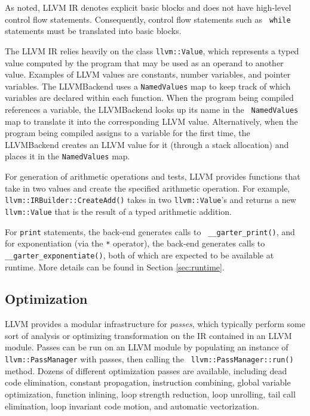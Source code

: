 \documentclass[11pt]{article}
\begin{document}
As noted, LLVM IR denotes explicit basic blocks and does not have high-level
control flow statements.  Consequently, control flow statements such as {\tt
while} statements must be translated into basic blocks.

The LLVM IR relies heavily on the class {\tt llvm::Value}, which represents a
typed value computed by the program that may be used as an operand to another
value.  Examples of LLVM values are constants, number variables, and pointer
variables.  The LLVMBackend uses a {\tt NamedValues} map to keep track of which
variables are declared within each function.  When the program being compiled
references a variable, the LLVMBackend looks up its name in the {\tt
NamedValues} map to translate it into the corresponding LLVM value.
Alternatively, when the program being compiled assigns to a variable for the
first time, the LLVMBackend creates an LLVM value for it (through a stack
allocation) and places it in the {\tt NamedValues} map.

For generation of arithmetic operations and tests, LLVM provides functions that
take in two values and create the specified arithmetic operation.  For example,
{\tt llvm::IRBuilder::CreateAdd()} takes in two {\tt llvm::Value}'s and returns
a new {\tt llvm::Value} that is the result of a typed arithmetic addition.

For {\tt print} statements, the back-end generates calls to {\tt
\_\_garter\_print()}, and for exponentiation (via the {\tt **} operator), the
back-end generates calls to {\tt \_\_garter\_exponentiate()}, both of which are
expected to be available at runtime.  More details can be found in Section
\ref{sec:runtime}.

\subsection{Optimization}

LLVM provides a modular infrastructure for {\em passes}, which typically perform
some sort of analysis or optimizing transformation on the IR contained in an
LLVM module.  Passes can be run on an LLVM module by populating an instance of
{\tt llvm::PassManager} with passes, then calling the {\tt
llvm::PassManager::run()} method.  Dozens of different optimization passes are
available, including dead code elimination, constant propagation, instruction
combining, global variable optimization, function inlining, loop strength
reduction, loop unrolling, tail call elimination, loop invariant code motion,
and automatic vectorization.
\end{document}
